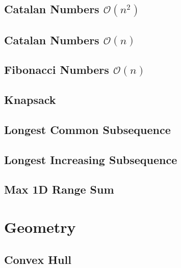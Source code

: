 \documentclass[11pt]{article}
\begin{document}
\subsection{Catalan Numbers $\mathcal{O}(n^2)$}


\subsection{Catalan Numbers $\mathcal{O}(n)$}


\subsection{Fibonacci Numbers $\mathcal{O}(n)$}


\subsection{Knapsack}


\subsection{Longest Common Subsequence}


\subsection{Longest Increasing Subsequence}


\subsection{Max 1D Range Sum}



\section{Geometry}

\subsection{Convex Hull}

\end{document}
